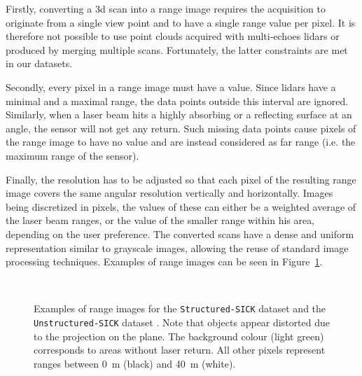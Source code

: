 Firstly, converting a \gls*{3d} scan into a range image requires the acquisition to originate from a single view point and to have a single range value per pixel. It is therefore not possible to use point clouds acquired with multi-echoes \gls*{lidar}s or produced by merging multiple scans. Fortunately, the latter constraints are met in our datasets.

Secondly, every pixel in a range image must have a value. Since \gls*{lidar}s have a minimal and a maximal range, the data points outside this interval are ignored. Similarly, when a laser beam hits a highly absorbing or a reflecting surface at an angle, the sensor will not get any return. Such missing data points cause pixels of the range image to have no value and are instead considered as far range (i.e. the maximum range of the sensor).

Finally, the resolution has to be adjusted so that each pixel of the resulting range image covers the same angular resolution vertically and horizontally. Images being discretized in pixels, the values of these can either be a weighted average of the laser beam ranges, or the value of the smaller range within his area, depending on the user preference. The converted scans have a dense and uniform representation similar to grayscale images, allowing the reuse of standard image processing techniques. Examples of range images can be seen in Figure~\ref{fig:chap_slam_range}.

\begin{figure}
    \centering
    \\
    \caption[Examples of range images from the two datasets.]{Examples of range images for the \texttt{Structured-SICK} dataset \protect{} and the \texttt{Unstructured-SICK} dataset \protect{}. Note that objects appear distorted due to the projection on the plane. The background colour (light green) corresponds to areas without laser return. All other pixels represent ranges between \SI{0}{\meter} (black) and \SI{40}{\meter} (white).}
    \label{fig:chap_slam_range}
\end{figure}

